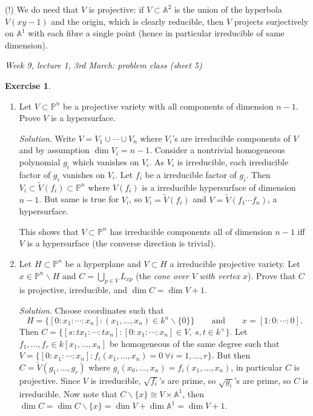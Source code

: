 \documentclass{article}
\newcommand{\A}{\mathbb{A}}
\newcommand{\p}{\mathbb{P}}
\theoremstyle{definition}
\newtheorem{exe}[defn]{Exercise}
\begin{document}
(!) We do need that $V$ is projective: if $V\subset\A^2$ is the union of the hyperbola $V(xy-1)$ and the origin, which is clearly reducible, then $V$ projects surjectively on $\A^1$ with each fibre a single point (hence in particular irreducible of same dimension).

\begin{flushright}
\textit{Week 9, lecture 1, 3rd March: problem class (sheet 5)}
\end{flushright}

\begin{exe}
\begin{enumerate}
\item Let $V\subset\p^n$ be a projective variety with all components of dimension $n-1$. Prove $V$ is a hypersurface.

\textit{Solution}. Write $V=V_1\cup\cdots\cup V_n$ where $V_i$'s are irreducible components of $V$ and by assumption $\dim V_i=n-1$. Consider a nontrivial homogeneous polynomial $g_i$ which vanishes on $V_i$. As $V_i$ is irreducible, each irreducible factor of $g_i$ vanishes on $V_i$. Let $f_i$ be a irreducible factor of $g_i$. Then $V_i\subset\widetilde V(f_i)\subset\p^n$ where $V(f_i)$ is a irreducible hypersurface of dimension $n-1$. But same is true for $V_i$, so $V_i=\widetilde V(f_i)$ and $V=\widetilde V(f_1\cdots f_n)$, a hypersurface.

This shows that $V\subset\p^n$ has irreducible components all of dimension $n-1$ iff $V$ is a hypersurface (the converse direction is trivial).

\item Let $H\subset\p^n$ be a hyperplane and $V\subset H$ a irreducible projective variety. Let $x\in\p^n\backslash H$ and $C=\bigcup_{p\in V}L_{xp}$ (the \textit{cone over} $V$ \textit{with vertex} $x$). Prove that $C$ is projective, irreducible, and $\dim C=\dim V+1$.

\textit{Solution}. Choose coordinates such that
\[
H=\{[0:x_1:\cdots:x_n]:(x_1,\ldots,x_n)\in k^n\backslash\{0\}\}\qquad \text{and} \qquad x=[1:0:\cdots:0].
\]
Then $C=\{[s:tx_1:\cdots:tx_n]:[0:x_1:\cdots:x_n]\in V,\ s,t\in k^\times\}$. Let $f_1,\ldots,f_r\in k[x_1,\ldots,x_n]$ be homogeneous of the same degree such that $V=\{[0:x_1:\cdots:x_n]:f_i(x_1,\ldots,x_n)=0 \ \forall i=1,\ldots,r\}$. But then $C=\widetilde V\left(g_1,\ldots,g_r\right)$ where $g_i(x_0,\ldots,x_n)=f_i(x_1,\ldots,x_n)$, in particular $C$ is projective. Since $V$ is irreducible, $\sqrt{f_i}$'s are prime, so $\sqrt{g_i}$'s are prime, so $C$ is irreducible. Now note that $C\backslash\{x\}\cong V\times\A^1$, then $\dim C=\dim C\backslash\{x\}=\dim V+\dim\A^1=\dim V+1$.


\end{enumerate}
\end{exe}
\end{document}
